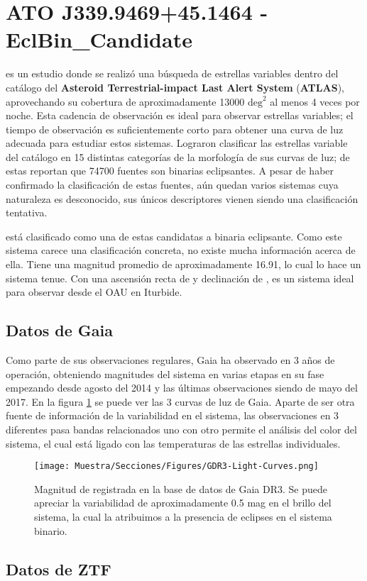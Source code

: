 \section{ATO J339.9469+45.1464 - EclBin\_Candidate}

 es un estudio donde se realizó una búsqueda de
estrellas variables dentro del catálogo del \textbf{Asteroid Terrestrial-impact
Last Alert System} (\textbf{ATLAS}), aprovechando su cobertura de
aproximadamente \num{13000} $\mathrm{deg}^2$ al menos 4 veces por noche. Esta
cadencia de observación es ideal para observar estrellas variables; el tiempo de
observación es suficientemente corto para obtener una curva de luz adecuada para
estudiar estos sistemas. Lograron clasificar las estrellas variable del catálogo
en 15 distintas categorías de la morfología de sus curvas de luz; de estas
reportan que \num{74700} fuentes son binarias eclipsantes. A pesar de haber
confirmado la clasificación de estas fuentes, aún quedan varios sistemas cuya
naturaleza es desconocido, sus únicos descriptores vienen siendo una
clasificación tentativa.

\textbf{\atoObjId} está clasificado como una de estas candidatas a binaria
eclipsante. Como este sistema carece una clasificación concreta, no existe mucha
información acerca de ella. Tiene una magnitud promedio de aproximadamente
\num{16.91}, lo cual lo hace un sistema tenue. Con una ascensión recta de
 y declinación de , \textbf{\atoObjId}
es un sistema ideal para observar desde el OAU en Iturbide.

\subsection{Datos de Gaia}

Como parte de sus observaciones regulares, Gaia ha observado \atoObjId en 3 años
de operación, obteniendo magnitudes del sistema en varias etapas en su fase
empezando desde agosto del 2014 y las últimas observaciones siendo de mayo del
2017. En la figura \ref{gdr3AtoObjLightCurves} se puede ver las 3 curvas de luz
de Gaia. Aparte de ser otra fuente de información de la variabilidad en el
sistema, las observaciones en 3 diferentes pasa bandas relacionados uno con otro
permite el análisis del color del sistema, el cual está ligado con las
temperaturas de las estrellas individuales.

\begin{figure}[!ht]
	\centering
	\texttt{[image: Muestra/Secciones/Figures/GDR3-Light-Curves.png]}

	\caption{Magnitud de \atoObjId registrada en la base de datos de Gaia DR3.
	Se puede apreciar la variabilidad de aproximadamente 0.5 mag en el brillo
	del sistema, la cual la atribuimos a la presencia de eclipses en el sistema
	binario. }
	\label{gdr3AtoObjLightCurves}
\end{figure}

\subsection{Datos de ZTF}